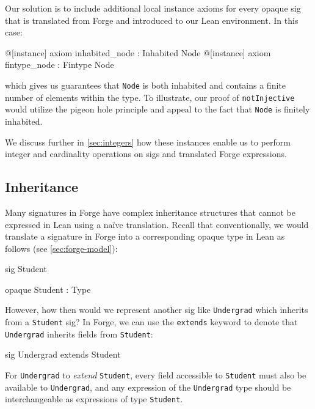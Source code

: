 Our solution is to include additional local instance axioms for every opaque sig that is translated from Forge and introduced to our Lean environment. In this case: 
\begin{lean*}
@[instance] axiom inhabited_node : Inhabited Node
@[instance] axiom fintype_node : Fintype Node
\end{lean*}
which gives us guarantees that \texttt{Node} is both inhabited and contains a finite number of elements within the type. To illustrate, our proof of \texttt{notInjective} would utilize the pigeon hole principle and appeal to the fact that \texttt{Node} is finitely inhabited. 

We discuss further in \cref{sec:integers} how these instances enable us to perform integer and cardinality operations on sigs and translated Forge expressions. 


\subsection{Inheritance}
Many signatures in Forge have complex inheritance structures \cite{jackson2012software} that cannot be expressed in Lean using a na\"ive translation. Recall that conventionally, we would translate a signature in Forge into a corresponding opaque type in Lean as follows (see \cref{sec:forge-model}):

\vspace{0.5em}
\noindent\begin{minipage}{0.5\textwidth}
\begin{forge*}sig Student {}\end{forge*}
\end{minipage}%
\begin{minipage}{0.5\textwidth}
\begin{lean*}opaque Student : Type\end{lean*}
\end{minipage}
\vspace{0.5em}

However, how then would we represent another sig like \texttt{Undergrad} which inherits from a \texttt{Student} sig? In Forge, we can use the \texttt{extends} keyword to denote that \texttt{Undergrad} inherits fields from \texttt{Student}: 
\begin{forge*}
sig Undergrad extends Student {}
\end{forge*}

For \texttt{Undergrad} to \emph{extend} \texttt{Student}, every field accessible to \texttt{Student} must also be available to \texttt{Undergrad}, and any expression of the \texttt{Undergrad} type should be interchangeable as expressions of type \texttt{Student}. 

